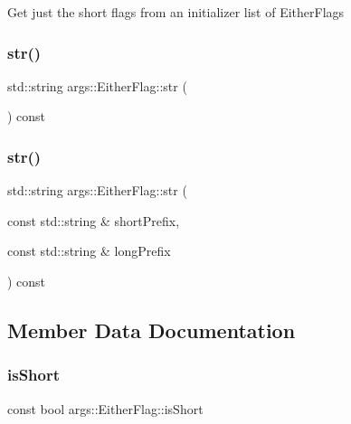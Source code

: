Get just the short flags from an initializer list of Either\+Flags \mbox{\label{structargs_1_1_either_flag_a5a758d897d6bc46aac191025cdeba164}} 
\subsubsection{\texorpdfstring{str()}{str()}\hspace{0.1cm}{\footnotesize\ttfamily [1/2]}}
{\footnotesize\ttfamily std\+::string args\+::\+Either\+Flag\+::str (\begin{DoxyParamCaption}{ }\end{DoxyParamCaption}) const\hspace{0.3cm}{\ttfamily [inline]}}

\mbox{\label{structargs_1_1_either_flag_ad10840d40ae21e3d14daa02db4c2e32d}} 
\subsubsection{\texorpdfstring{str()}{str()}\hspace{0.1cm}{\footnotesize\ttfamily [2/2]}}
{\footnotesize\ttfamily std\+::string args\+::\+Either\+Flag\+::str (\begin{DoxyParamCaption}\item[{const std\+::string \&}]{short\+Prefix,  }\item[{const std\+::string \&}]{long\+Prefix }\end{DoxyParamCaption}) const\hspace{0.3cm}{\ttfamily [inline]}}



\subsection{Member Data Documentation}
\mbox{\label{structargs_1_1_either_flag_afada1f6945d0f18233f9fe1466e94137}} 
\subsubsection{\texorpdfstring{is\+Short}{isShort}}
{\footnotesize\ttfamily const bool args\+::\+Either\+Flag\+::is\+Short}

